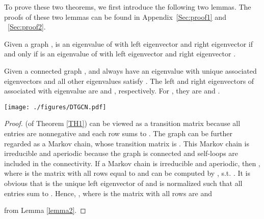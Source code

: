 \documentclass[sigconf]{acmart}
\begin{document}
To prove these two theorems, we first introduce the following two
lemmas. The proofs of these two lemmas can be found in Appendix~\ref{Sec:proof1} and ~\ref{Sec:proof2}.

\begin{lemma}
\label{lemma1}
Given a graph ,  is an eigenvalue of
 with left eigenvector
 and right
eigenvector  if
and only if  is an eigenvalue of
 with left eigenvector
 and right eigenvector
.
\end{lemma}






\begin{lemma}
\label{lemma2}
Given a connected graph ,
 and
 always have an eigenvalue
 with unique associated eigenvectors and all other
eigenvalues  satisfy .
The left and right eigenvectors of
  associated with eigenvalue
 are  and , respectively. For
, they are
 and
.
\end{lemma}



\begin{figure*}
\centering
\texttt{[image: ./figures/DTGCN.pdf]}
\caption{An illustration of the proposed Deep Adaptive Graph Neural Network (DAGNN) . For clarity, we show the pipeline to generate the prediction for one node. Notation letters are consistent with~Eq.(\ref{EQ:DTCGN}) but bold lowercase versions are applied to denote representation vectors.  is the projection vector that computes retainment scores for representations generating from various receptive fields. , , , and  represent the retainment scores of , , , and , respectively.}
\label{fig:dtgcn}
\end{figure*}

\begin{proof}
(of Theorem \ref{TH1})  can
be viewed as a transition matrix because all entries are
nonnegative and each row sums to . The graph  can be
further regarded as a Markov chain, whose transition matrix
 is . This
Markov chain is irreducible and aperiodic because the graph
 is connected and self-loops are included in the
connectivity. If a Markov chain is irreducible and aperiodic,
then ,
where  is the matrix with all rows equal to
 and  can be computed by
, s.t.
\cite{kumar2015stochastic}. It
is obvious that  is the unique left
eigenvector of  and is normalized such that
all entries sum to .  Hence, ,
where  is the matrix with all rows
are  and

from Lemma \ref{lemma2}.
\end{proof}
\end{document}
